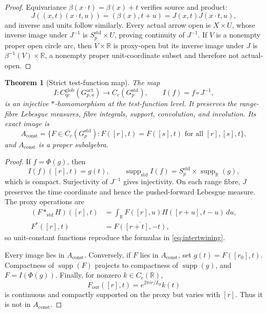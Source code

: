 \documentclass[11pt]{article}
\newtheorem{theorem}{Theorem}[section]
\theoremstyle{definition}
\newcommand{\R}{\mathbb R}
\newcommand{\Gact}{G_{p,a}^{\mathrm{act}}}
\newcommand{\Gstd}{G_p^{\mathrm{std}}}
\newcommand{\Cglob}{C_{\mathrm{qc}}^{\mathrm{glob}}}
\newcommand{\Aconst}{A_{\mathrm{const}}}
\newcommand{\supp}{\operatorname{supp}}
\begin{document}
\begin{proof}
Equivariance $\beta(x\cdot t)=\beta(x)+t$ verifies source and product:
\[
 J((x,t)(x\cdot t,u))=(\beta(x),t+u)
 =J(x,t)J(x\cdot t,u),
\]
and inverse and units follow similarly.  Every actual arrow open is
$X\times U$, whose inverse image under $J^{-1}$ is
$S_p^{\mathrm{std}}\times U$, proving continuity of $J^{-1}$.  If $V$ is
a nonempty proper open circle arc, then $V\times\R$ is proxy-open but its
inverse image under $J$ is $\beta^{-1}(V)\times\R$, a nonempty proper
unit-coordinate subset and therefore not actual-open.
\end{proof}

\begin{theorem}[Strict test-function map]
\label{thm:I}
The map
\[
 I:\Cglob(\Gact)\longrightarrow C_c(\Gstd),\qquad I(f)=f\circ J^{-1},
\]
is an injective $*$-homomorphism at the test-function level.  It preserves
the range-fibre Lebesgue measures, fibre integrals, support, convolution, and
involution.  Its exact image is
\begin{equation}
 \Aconst=\{F\in C_c(\Gstd):F([r],t)=F([s],t)
 \text{ for all }[r],[s],t\},
 \label{eq:Aconst}
\end{equation}
and $\Aconst$ is a proper subalgebra.
\end{theorem}

\begin{proof}
If $f=\Phi(g)$, then
\[
 I(f)([r],t)=g(t),\qquad
 \supp_{\mathrm{std}}I(f)=S_p^{\mathrm{std}}\times\supp_{\R}(g),
\]
which is compact.  Surjectivity of $J^{-1}$ gives injectivity.  On each range
fibre, $J$ preserves the time coordinate and hence the pushed-forward
Lebesgue measure.  The proxy operations are
\begin{align*}
 (F*_{\mathrm{std}}H)([r],t)
 &=\int_{\R} F([r],u)H([r+u],t-u)\,du,\\
 F^*([r],t)&=\overline{F([r+t],-t)},
\end{align*}
so unit-constant functions reproduce the formulas in
\cref{eq:intertwining}.

Every image lies in $\Aconst$.  Conversely, if $F$ lies in $\Aconst$, set
$g(t)=F([r_0],t)$.  Compactness of $\supp(F)$ projects to compactness of
$\supp(g)$, and $F=I(\Phi(g))$.  Finally, for nonzero $k\in C_c(\R)$,
\begin{equation}
 F_{\mathrm{out}}([r],t)=e^{2\pi i r/L_p}k(t)
 \label{eq:strict-witness}
\end{equation}
is continuous and compactly supported on the proxy but varies with $[r]$.
Thus it is not in $\Aconst$.
\end{proof}
\end{document}

